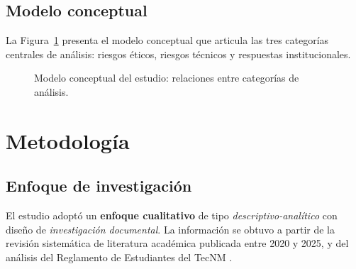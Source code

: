 \documentclass[review]{elsarticle}
\begin{document}
	\subsection{Modelo conceptual}
	
	La Figura~\ref{fig:modelo} presenta el modelo conceptual que articula las tres categorías centrales de análisis: riesgos éticos, riesgos técnicos y respuestas institucionales.
	
	\begin{figure}[H]
		\centering
		\caption{Modelo conceptual del estudio: relaciones entre categorías de análisis.}
		\label{fig:modelo}
	\end{figure}
	
	\section{Metodología}
	
	\subsection{Enfoque de investigación}
	
	El estudio adoptó un \textbf{enfoque cualitativo} de tipo \textit{descriptivo-analítico} con diseño de \textit{investigación documental}. La información se obtuvo a partir de la revisión sistemática de literatura académica publicada entre 2020 y 2025, y del análisis del Reglamento de Estudiantes del TecNM \citep{tecnm2023}.
	
\end{document}
